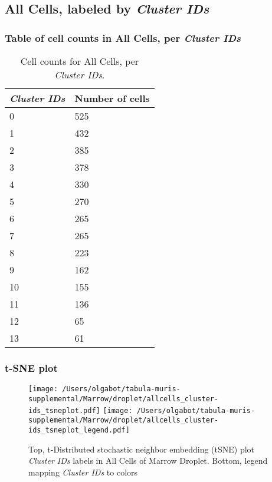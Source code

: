 \clearpage

\subsection{All Cells, labeled by \emph{Cluster IDs}}
\subsubsection{Table of cell counts in All Cells, per \emph{Cluster IDs}}\begin{table}[h]
\centering
\label{my-label}
\begin{tabular}{@{}ll@{}}
\toprule

\emph{Cluster IDs}& Number of cells \\ \midrule
0 & 525 \\

1 & 432 \\

2 & 385 \\

3 & 378 \\

4 & 330 \\

5 & 270 \\

6 & 265 \\

7 & 265 \\

8 & 223 \\

9 & 162 \\

10 & 155 \\

11 & 136 \\

12 & 65 \\

13 & 61 \\
\bottomrule
\end{tabular}
\caption{Cell counts for All Cells, per \emph{Cluster IDs}.}
\end{table}

\clearpage
\subsubsection{t-SNE plot}
\begin{figure}[h]
\centering
\texttt{[image: /Users/olgabot/tabula-muris-supplemental/Marrow/droplet/allcells\_cluster-ids\_tsneplot.pdf]}
\texttt{[image: /Users/olgabot/tabula-muris-supplemental/Marrow/droplet/allcells\_cluster-ids\_tsneplot\_legend.pdf]}
\caption{Top, t-Distributed stochastic neighbor embedding (tSNE) plot  \emph{Cluster IDs} labels in All Cells of Marrow Droplet. Bottom, legend mapping \emph{Cluster IDs} to colors}
\end{figure}


